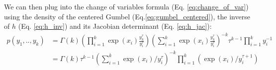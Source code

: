 \documentclass{article} %
\begin{document}
We can then plug into the change of variables formula (Eq. \ref{eq:change_of_var}) using the density of the centered Gumbel (Eq.\ref{eq:gumbel_centered}), the inverse of $h$ (Eq. \ref{eq:h_inv}) and its Jacobian determinant (Eq. \ref{eq:h_jac}):
\begin{align}
p(y_1, .., y_k) &= \Gamma(k)\left(\prod_{i=1}^k\exp\left(x_i\right)\frac{y_k^\tau}{y_i^\tau}\right)\left(\sum_{i=1}^{k} \exp\left(x_i\right)\frac{y_k^\tau}{y_i^\tau}\right)^{-k} \tau^{k-1}\prod_{i=1}^{k} y_i^{-1}\\
&= \Gamma(k)\tau^{k-1}\left(\sum_{i=1}^{k} \exp\left(x_i\right)/{y_i^\tau}\right)^{-k} \prod_{i=1}^k\left(\exp\left(x_i\right)/y_i^{\tau+1}\right)
\end{align}
\end{document}
